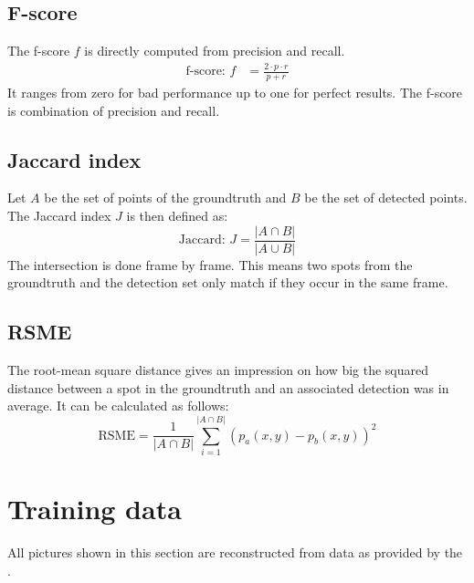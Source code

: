 \subsection*{F-score}
The f-score $f$ is directly computed from precision and recall.
\begin{eqnarray}
	\text{f-score: }f &=\frac{2\cdot p \cdot r}{p+r} 
\end{eqnarray}
It ranges from zero for bad performance up to one for perfect results. The f-score is combination of precision and recall.
\subsection*{Jaccard index}
Let $A$ be the set of points of the groundtruth and $B$ be the set of detected points. The Jaccard index $J$ is then defined as:
\begin{equation}
\text{Jaccard: }J = \frac{\left|A\cap B\right|}{\left|A\cup B\right|}
\end{equation}
The intersection is done frame by frame. This means two spots from the groundtruth and the detection set only match if they occur in the same frame. 
\subsection*{RSME}
The root-mean square distance gives an impression on how big the squared distance between a spot in the groundtruth and an associated detection was in average. It can be calculated as follows:
\begin{equation}
\text{RSME} = \frac{1}{\left|A\cap B\right|}\sum\limits_{i=1}^{\left|A\cap B\right|} \left(p_a(x,y)-p_b(x,y)\right)^2
\end{equation}
\section{Training data}
All pictures shown in this section are reconstructed from data as provided by the \cite{challenge}.
